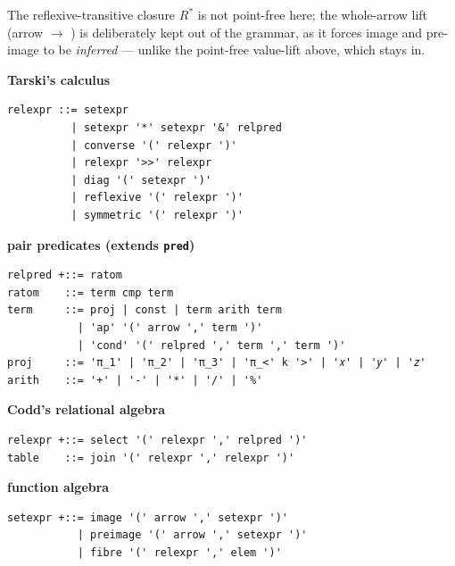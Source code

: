 \documentclass[11pt, a4paper]{article}
\begin{document}
\begin{listing}[htbp]
{The reflexive-transitive closure $R^{*}$ is not point-free here; the whole-arrow  lift (arrow $\to$ ) is deliberately kept out of the grammar, as it forces image and pre-image to be \emph{inferred} --- unlike the point-free value-lift  above, which stays in.}
\label{lst:relation-grammar}
\noindent
\begin{minipage}[t]{0.49\linewidth}
{\footnotesize\textbf{Tarski's calculus}}
\begin{verbatim}
relexpr ::= setexpr
          | setexpr '*' setexpr '&' relpred
          | converse '(' relexpr ')'
          | relexpr '>>' relexpr
          | diag '(' setexpr ')'
          | reflexive '(' relexpr ')'
          | symmetric '(' relexpr ')'
\end{verbatim}
\end{minipage}\hfill
\begin{minipage}[t]{0.49\linewidth}
{\footnotesize\textbf{pair predicates (extends \texttt{pred})}}
\begin{verbatim}
relpred +::= ratom
ratom    ::= term cmp term
term     ::= proj | const | term arith term
           | 'ap' '(' arrow ',' term ')'
           | 'cond' '(' relpred ',' term ',' term ')'
proj     ::= 'π_1' | 'π_2' | 'π_3' | 'π_<' k '>' | '𝑥' | '𝑦' | '𝑧'
arith    ::= '+' | '-' | '*' | '/' | '%'
\end{verbatim}
\end{minipage}

\vspace{0.6em}
\noindent
\begin{minipage}[t]{0.49\linewidth}
{\footnotesize\textbf{Codd's relational algebra}}
\begin{verbatim}
relexpr +::= select '(' relexpr ',' relpred ')'
table    ::= join '(' relexpr ',' relexpr ')'
\end{verbatim}
\end{minipage}\hfill
\begin{minipage}[t]{0.49\linewidth}
{\footnotesize\textbf{function algebra}}
\begin{verbatim}
setexpr +::= image '(' arrow ',' setexpr ')'
           | preimage '(' arrow ',' setexpr ')'
           | fibre '(' relexpr ',' elem ')'
\end{verbatim}
\end{minipage}


\end{listing}
\end{document}
